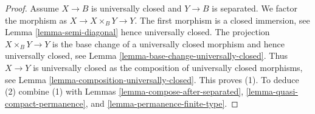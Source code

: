 \documentclass[10pt,a4paper]{amsart}
\theoremstyle{plain}
\theoremstyle{definition}
\theoremstyle{remark}
\numberwithin{equation}{subsection}
\begin{document}
\begin{proof}
Assume $X \to B$ is universally closed and $Y \to B$ is separated.
We factor the morphism as $X \to X \times_B Y \to Y$.
The first morphism is a closed immersion, see
Lemma \ref{lemma-semi-diagonal}
hence universally closed.
The projection $X \times_B Y \to Y$ is the base change
of a universally closed morphism and hence
universally closed, see
Lemma \ref{lemma-base-change-universally-closed}.
Thus $X \to Y$ is universally closed as the composition
of universally closed morphisms, see
Lemma \ref{lemma-composition-universally-closed}.
This proves (1). To deduce (2) combine (1) with
Lemmas \ref{lemma-compose-after-separated},
\ref{lemma-quasi-compact-permanence}, and
\ref{lemma-permanence-finite-type}.
\end{proof}
\end{document}
